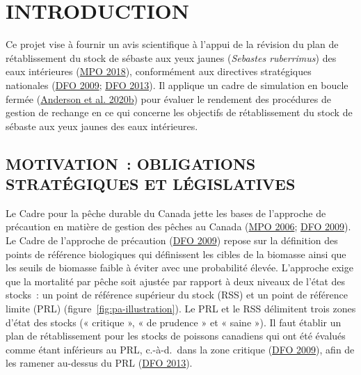 \documentclass[french,11pt]{book}
\begin{document}
\renewcommand{\tablename}{Tableau}
\frontmatter

\clearpage

\hypertarget{sec:introduction}{%
\section{INTRODUCTION}\label{sec:introduction}}

Ce projet vise à fournir un avis scientifique à l'appui de la révision du plan de rétablissement du stock de sébaste aux yeux jaunes (\emph{Sebastes ruberrimus}) des eaux intérieures (\protect\hyperlink{ref-ifmp2018}{MPO 2018}), conformément aux directives stratégiques nationales (\protect\hyperlink{ref-dfo2009}{DFO 2009}; \protect\hyperlink{ref-dfo2013}{DFO 2013}). Il applique un cadre de simulation en boucle fermée (\protect\hyperlink{ref-anderson2020gfmp}{Anderson et al. 2020b}) pour évaluer le rendement des procédures de gestion de rechange en ce qui concerne les objectifs de rétablissement du stock de sébaste aux yeux jaunes des eaux intérieures.

\hypertarget{sec:introduction-motivation}{%
\subsection{MOTIVATION~: OBLIGATIONS STRATÉGIQUES ET LÉGISLATIVES}\label{sec:introduction-motivation}}

Le Cadre pour la pêche durable du Canada jette les bases de l'approche de précaution en matière de gestion des pêches au Canada (\protect\hyperlink{ref-dfo2006}{MPO 2006}; \protect\hyperlink{ref-dfo2009}{DFO 2009}). Le Cadre de l'approche de précaution (\protect\hyperlink{ref-dfo2009}{DFO 2009}) repose sur la définition des points de référence biologiques qui définissent les cibles de la biomasse ainsi que les seuils de biomasse faible à éviter avec une probabilité élevée. L'approche exige que la mortalité par pêche soit ajustée par rapport à deux niveaux de l'état des stocks~: un point de référence supérieur du stock (RSS) et un point de référence limite (PRL) (figure~\ref{fig:pa-illustration}). Le PRL et le RSS délimitent trois zones d'état des stocks (« critique », « de prudence » et « saine »). Il faut établir un plan de rétablissement pour les stocks de poissons canadiens qui ont été évalués comme étant inférieurs au PRL, c.-à-d.~dans la zone critique (\protect\hyperlink{ref-dfo2009}{DFO 2009}), afin de les ramener au-dessus du PRL (\protect\hyperlink{ref-dfo2013}{DFO 2013}).
\end{document}
